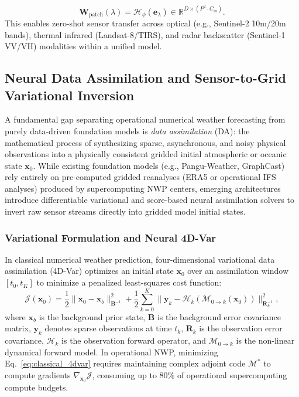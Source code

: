 \begin{enumerate}
    \begin{equation}
        \mathbf{W}_{\text{patch}}(\lambda) = \mathcal{H}_\phi(\mathbf{e}_\lambda) \in \mathbb{R}^{D \times (P^2 \cdot C_{\text{in}})}.
    \end{equation}
    This enables zero-shot sensor transfer across optical (e.g., Sentinel-2 10m/20m bands), thermal infrared (Landsat-8/TIRS), and radar backscatter (Sentinel-1 VV/VH) modalities within a unified model.
\end{enumerate}

\subsection{Neural Data Assimilation and Sensor-to-Grid Variational Inversion}
\label{sec:neural_data_assimilation}
A fundamental gap separating operational numerical weather forecasting from purely data-driven foundation models is \textit{data assimilation} (DA): the mathematical process of synthesizing sparse, asynchronous, and noisy physical observations into a physically consistent gridded initial atmospheric or oceanic state $\mathbf{x}_0$. While existing foundation models (e.g., Pangu-Weather, GraphCast) rely entirely on pre-computed gridded reanalyses (ERA5 or operational IFS analyses) produced by supercomputing NWP centers, emerging architectures introduce differentiable variational and score-based neural assimilation solvers to invert raw sensor streams directly into gridded model initial states.

\subsubsection{Variational Formulation and Neural 4D-Var}
In classical numerical weather prediction, four-dimensional variational data assimilation (4D-Var) optimizes an initial state $\mathbf{x}_0$ over an assimilation window $[t_0, t_K]$ to minimize a penalized least-squares cost function:
\begin{equation}
    \mathcal{J}(\mathbf{x}_0) = \frac{1}{2} \|\mathbf{x}_0 - \mathbf{x}_b\|_{\mathbf{B}^{-1}}^2 + \frac{1}{2} \sum_{k=0}^{K} \|\mathbf{y}_k - \mathcal{H}_k(\mathcal{M}_{0 \to k}(\mathbf{x}_0))\|_{\mathbf{R}_k^{-1}}^2,
    \label{eq:classical_4dvar}
\end{equation}
where $\mathbf{x}_b$ is the background prior state, $\mathbf{B}$ is the background error covariance matrix, $\mathbf{y}_k$ denotes sparse observations at time $t_k$, $\mathbf{R}_k$ is the observation error covariance, $\mathcal{H}_k$ is the observation forward operator, and $\mathcal{M}_{0 \to k}$ is the non-linear dynamical forward model. In operational NWP, minimizing Eq.~\eqref{eq:classical_4dvar} requires maintaining complex adjoint code $\mathcal{M}^*$ to compute gradients $\nabla_{\mathbf{x}_0} \mathcal{J}$, consuming up to 80\% of operational supercomputing compute budgets.

